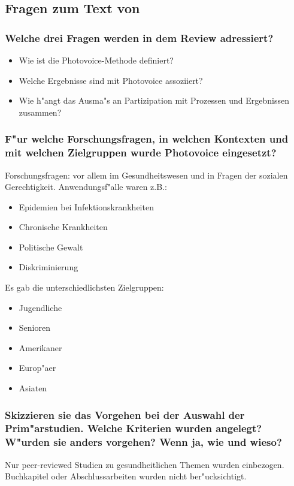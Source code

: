 \subsection{Fragen zum Text von \textcite{catalani_photovoice:_2010}}
\subsubsection{Welche drei Fragen werden in dem Review adressiert?}
\begin{itemize}
        \item Wie ist die Photovoice-Methode definiert?
        \item Welche Ergebnisse sind mit Photovoice assoziiert?
        \item Wie h"angt das Ausma"s an Partizipation mit Prozessen und Ergebnissen zusammen?
\end{itemize}

\subsubsection{F"ur welche Forschungsfragen, in welchen Kontexten und mit welchen Zielgruppen wurde Photovoice eingesetzt?}
Forschungsfragen: vor allem im Gesundheitswesen und in Fragen der sozialen Gerechtigkeit. Anwendungsf"alle waren z.B.:
\begin{itemize}
        \item Epidemien bei Infektionskrankheiten
        \item Chronische Krankheiten
        \item Politische Gewalt
        \item Diskriminierung
\end{itemize}

Es gab die unterschiedlichsten Zielgruppen:
\begin{itemize}
        \item Jugendliche
        \item Senioren
        \item Amerikaner
        \item Europ"aer
        \item Asiaten
\end{itemize}

\subsubsection{Skizzieren sie das Vorgehen bei der Auswahl der Prim"arstudien. Welche Kriterien wurden angelegt? W"urden sie anders vorgehen? Wenn ja, wie und wieso?}
Nur peer-reviewed Studien zu gesundheitlichen Themen wurden einbezogen. Buchkapitel oder Abschlussarbeiten wurden nicht ber"ucksichtigt.

